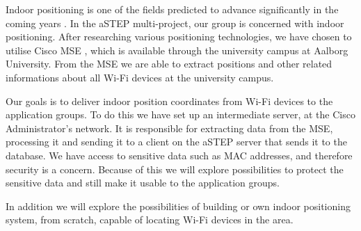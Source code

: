 Indoor positioning is one of the fields predicted to advance significantly in the coming years \cite{DonDIndoorIsNext}. In the aSTEP multi-project, our group is concerned with indoor positioning. After researching various positioning technologies, we have chosen to utilise Cisco MSE \cite{ciscoMSE}, which is available through the university campus at Aalborg University. From the MSE we are able to extract positions and other related informations about all Wi-Fi devices at the university campus.

Our goals is to deliver indoor position coordinates from Wi-Fi devices to the application groups. To do this we have set up an intermediate server, at the Cisco Administrator's network. It is responsible for extracting data from the MSE, processing it and sending it to a client on the aSTEP server that sends it to the database. We have access to sensitive data such as MAC addresses, and therefore security is a concern. Because of this we will explore possibilities to protect the sensitive data and still make it usable to the application groups.

In addition we will explore the possibilities of building or own indoor positioning system, from scratch, capable of locating Wi-Fi devices in the area.
